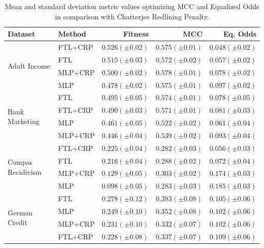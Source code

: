  \begin{table}
    \centering
    \caption{Mean and standard deviation metric values optimizing MCC and Equalized Odds in comparison with Chatterjee Redlining Penalty.}\label{tab:complete_mcc_odds_crp}
    {\footnotesize\begin{tabular}{llrrr}
    \toprule
    Dataset & Method & Fitness & MCC & Eq. Odds \\
    \midrule

    \multirow[t]{4}{*}{Adult Income} & FTL+CRP & $0.526 (\pm0.02)$ & $0.575 (\pm0.01)$ & $0.048 (\pm0.02)$ \\
     & FTL & $0.515 (\pm0.03)$ & $0.572 (\pm0.02)$ & $0.057 (\pm0.02)$ \\
     & MLP+CRP & $0.500 (\pm0.02)$ & $0.578 (\pm0.01)$ & $0.078 (\pm0.02)$ \\
     & MLP & $0.478 (\pm0.02)$ & $0.575 (\pm0.01)$ & $0.097 (\pm0.02)$ \\
    \midrule
    \multirow[t]{4}{*}{Bank Marketing} & FTL & $0.495 (\pm0.05)$ & $0.574 (\pm0.01)$ & $0.078 (\pm0.05)$ \\
     & FTL+CRP & $0.490 (\pm0.03)$ & $0.571 (\pm0.01)$ & $0.081 (\pm0.03)$ \\
     & MLP & $0.461 (\pm0.05)$ & $0.522 (\pm0.02)$ & $0.061 (\pm0.04)$ \\
     & MLP+CRP & $0.446 (\pm0.04)$ & $0.539 (\pm0.02)$ & $0.093 (\pm0.04)$ \\
    \midrule
    \multirow[t]{4}{*}{Compas Recidivism} & FTL+CRP & $0.225 (\pm0.04)$ & $0.282 (\pm0.03)$ & $0.056 (\pm0.03)$ \\
     & FTL & $0.216 (\pm0.04)$ & $0.288 (\pm0.02)$ & $0.072 (\pm0.04)$ \\
     & MLP+CRP & $0.129 (\pm0.05)$ & $0.303 (\pm0.02)$ & $0.174 (\pm0.03)$ \\
     & MLP & $0.098 (\pm0.05)$ & $0.283 (\pm0.03)$ & $0.185 (\pm0.03)$ \\
    \midrule
    \multirow[t]{4}{*}{German Credit} & FTL & $0.278 (\pm0.12)$ & $0.383 (\pm0.08)$ & $0.105 (\pm0.06)$ \\
     & MLP & $0.249 (\pm0.10)$ & $0.352 (\pm0.08)$ & $0.102 (\pm0.06)$ \\
     & MLP+CRP & $0.231 (\pm0.10)$ & $0.332 (\pm0.07)$ & $0.102 (\pm0.06)$ \\
     & FTL+CRP & $0.228 (\pm0.08)$ & $0.337 (\pm0.07)$ & $0.109 (\pm0.06)$ \\
     \bottomrule
\end{tabular}}
\end{table}

